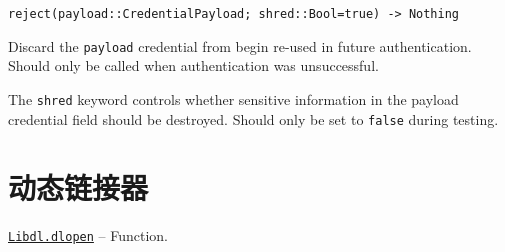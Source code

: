 \begin{adjustwidth}{2em}{0pt}


\begin{verbatim}
reject(payload::CredentialPayload; shred::Bool=true) -> Nothing
\end{verbatim}

Discard the \texttt{payload} credential from begin re-used in future authentication. Should only be called when authentication was unsuccessful.

The \texttt{shred} keyword controls whether sensitive information in the payload credential field should be destroyed. Should only be set to \texttt{false} during testing.



\end{adjustwidth}

\hypertarget{13528239852401045842}{}


\chapter{动态链接器}


\hypertarget{8171750449393676854}{} 
\hyperlink{8171750449393676854}{\texttt{Libdl.dlopen}}  -- {Function.}

